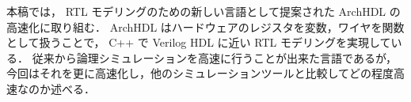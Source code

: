 本稿では， RTL モデリングのための新しい言語として提案された ArchHDL の高速化に取り組む．
ArchHDL はハードウェアのレジスタを変数，ワイヤを関数として扱うことで， C++ で Verilog HDL に近い
RTL モデリングを実現している．
従来から論理シミュレーションを高速に行うことが出来た言語であるが，今回はそれを更に高速化し，他のシミュレーションツールと比較してどの程度高速なのか述べる．